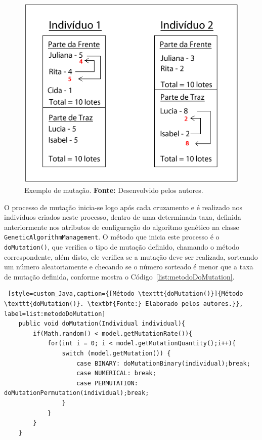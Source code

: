 \begin{figure}[h!]
	\centerline{\includegraphics[scale=0.7]{./imagens/mutacao_cromossomo.png}}
	\caption[Exemplo de mutação.]
	{Exemplo de mutação.
		\textbf{Fonte:} Desenvolvido pelos autores.}
	\label{fig:ex_mutacao}
\end{figure}


\par O processo de mutação inicia-se logo após cada cruzamento e é realizado
nos indivíduos criados neste processo, dentro de uma determinada taxa, definida anteriormente nos atributos de configuração do algoritmo genético na classe \texttt{GeneticAlgorithmManagement}. O método que inicia este processo é o \texttt{doMutation()}, que verifica o tipo de mutação definido, chamando o método correspondente, além disto, ele verifica se a mutação deve ser realizada, sorteando um número aleatoriamente e checando se o número sorteado é menor que a taxa de mutação definida, conforme mostra o Código~\ref{list:metodoDoMutation}. 

\begin{lstlisting} [style=custom_Java,caption={[Método \texttt{doMutation()}]{Método \texttt{doMutation()}. \textbf{Fonte:} Elaborado pelos autores.}}, label=list:metodoDoMutation] 
	public void doMutation(Individual individual){
		if(Math.random() < model.getMutationRate()){
			for(int i = 0; i < model.getMutationQuantity();i++){
				switch (model.getMutation()) {
					case BINARY: doMutationBinary(individual);break;
					case NUMERICAL: break;
					case PERMUTATION: doMutationPermutation(individual);break;
				}
			}
		}
	}

\end{lstlisting}

